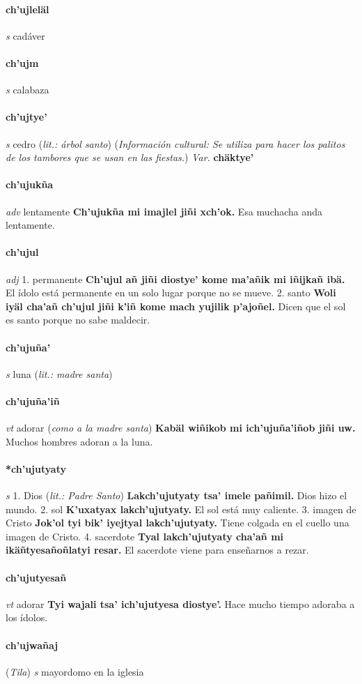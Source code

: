 \documentclass{scrbook}
\newcommand{\entry}[1]{\paragraph{#1}}
\newcommand{\onedefinition}[1]{#1.}
\newcommand{\partofspeech}[1]{\textit{#1}}
\newcommand{\spanishtranslation}[1]{#1}
\newcommand{\clarification}[1]{(\textit{#1})}
\newcommand{\cholexample}[1]{\textbf{#1}}
\newcommand{\exampletranslation}[1]{#1}
\newcommand{\relevantdialect}[1]{(\textit{#1})}
\newcommand{\culturalinformation}[1]{(\textit{#1})}
\newcommand{\variation}[1]{\textit{Var.} \textbf{#1}}
\begin{document}
\begin{multicols}{2}
\entry{ch'ujleläl}
\partofspeech{s}
\spanishtranslation{cadáver}

\entry{ch'ujm}
\partofspeech{s}
\spanishtranslation{calabaza}

\entry{ch'ujtye'}
\partofspeech{s}
\spanishtranslation{cedro}
\clarification{lit.: árbol santo}
\culturalinformation{Información cultural: Se utiliza para hacer los palitos de los tambores que se usan en las fiestas.}
\variation{chäktye'}

\entry{ch'ujukña}
\partofspeech{adv}
\spanishtranslation{lentamente}
\cholexample{Ch'ujukña mi imajlel jiñi xch'ok.}
\exampletranslation{Esa muchacha anda lentamente.}

\entry{ch'ujul}
\partofspeech{adj}
\onedefinition{1}
\spanishtranslation{permanente}
\cholexample{Ch'ujul añ jiñi diostye' kome ma'añik mi iñijkañ ibä.}
\exampletranslation{El ídolo está permanente en un solo lugar porque no se mueve.}
\onedefinition{2}
\spanishtranslation{santo}
\cholexample{Woli iyäl cha'añ ch'ujul jiñi k'iñ kome mach yujilik p'ajoñel.}
\exampletranslation{Dicen que el sol es santo porque no sabe maldecir.}

\entry{ch'ujuña'}
\partofspeech{s}
\spanishtranslation{luna}
\clarification{lit.: madre santa}

\entry{ch'ujuña'iñ}
\partofspeech{vt}
\spanishtranslation{adorar}
\clarification{como a la madre santa}
\cholexample{Kabäl wiñikob mi ich'ujuña'iñob jiñi uw.}
\exampletranslation{Muchos hombres adoran a la luna.}

\entry{*ch'ujutyaty}
\partofspeech{s}
\onedefinition{1}
\spanishtranslation{Dios}
\clarification{lit.: Padre Santo}
\cholexample{Lakch'ujutyaty tsa' imele pañimil.}
\exampletranslation{Dios hizo el mundo.}
\onedefinition{2}
\spanishtranslation{sol}
\cholexample{K'uxatyax lakch'ujutyaty.}
\exampletranslation{El sol está muy caliente.}
\onedefinition{3}
\spanishtranslation{imagen de Cristo}
\cholexample{Jok'ol tyi bik' iyejtyal lakch'ujutyaty.}
\exampletranslation{Tiene colgada en el cuello una imagen de Cristo.}
\onedefinition{4}
\spanishtranslation{sacerdote}
\cholexample{Tyal lakch'ujutyaty cha'añ mi ikäñtyesañoñlatyi resar.}
\exampletranslation{El sacerdote viene para enseñarnos a rezar.}

\entry{ch'ujutyesañ}
\partofspeech{vt}
\spanishtranslation{adorar}
\cholexample{Tyi wajali tsa' ich'ujutyesa diostye'.}
\exampletranslation{Hace mucho tiempo adoraba a los ídolos.}

\entry{ch'ujwañaj}
\relevantdialect{Tila}
\partofspeech{s}
\spanishtranslation{mayordomo en la iglesia}


\end{multicols}
\end{document}
